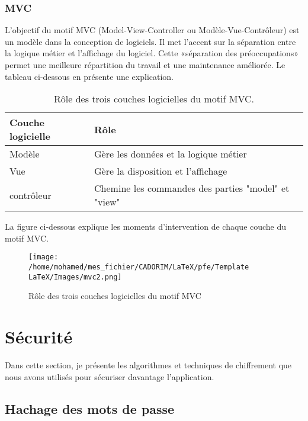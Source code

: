 \subsubsection{MVC}
\label{3.3.3.1}
L'objectif du motif MVC (Model-View-Controller ou Modèle-Vue-Contrôleur) est un modèle dans la conception de logiciels. Il met l'accent sur la séparation entre la logique métier et l'affichage du logiciel. Cette «séparation des préoccupations» permet une meilleure répartition du travail et une maintenance améliorée. Le tableau ci-dessous en présente une explication.
\newline\newline
\begin{table}[h]
	\begin{tabular}{|m{6cm}|m{10cm}|}
		\hline
		\textbf{Couche logicielle} & \textbf{Rôle} \\
		\hline
		Modèle & Gère les données et la logique métier \\
		\hline
		Vue & Gère la disposition et l'affichage \\
		\hline
		contrôleur & Chemine les commandes des parties "model" et "view" \\
		\hline
	\end{tabular}
	\caption{Rôle des trois couches logicielles du motif MVC.}
\end{table}
\newline La figure ci-dessous explique les moments d'intervention de chaque couche du motif MVC.
\begin{figure}[h]
	\texttt{[image: /home/mohamed/mes\_fichier/CADORIM/LaTeX/pfe/Template LaTeX/Images/mvc2.png]}
	\centering
	\caption{Rôle des trois couches logicielles du motif MVC}
\end{figure}
\section{Sécurité}
Dans cette section, je présente les algorithmes et techniques de chiffrement que nous avons
utilisés pour sécuriser davantage l'application.
\subsection{Hachage des mots de passe}
